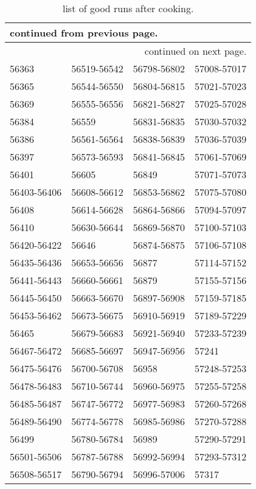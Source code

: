 \begin{center}
\begin{singlespacing}
\begin{longtable}{llll}
\caption[ Production Run List]{\label{tab:data.cook.goodruns}list of good runs after cooking.} \\

\hline \hline
\endfirsthead

\multicolumn{4}{l}{\scriptsize continued from previous page.} \\
\hline
\endhead

\hline
\multicolumn{4}{r}{\scriptsize continued on next page.} \\
\endfoot

\hline \hline
\endlastfoot

56363 & 56519-56542 & 56798-56802 & 57008-57017 \\
56365 & 56544-56550 & 56804-56815 & 57021-57023 \\
56369 & 56555-56556 & 56821-56827 & 57025-57028 \\
56384 & 56559 & 56831-56835 & 57030-57032 \\
56386 & 56561-56564 & 56838-56839 & 57036-57039 \\
56397 & 56573-56593 & 56841-56845 & 57061-57069 \\
56401 & 56605 & 56849 & 57071-57073 \\
56403-56406 & 56608-56612 & 56853-56862 & 57075-57080 \\
56408 & 56614-56628 & 56864-56866 & 57094-57097 \\
56410 & 56630-56644 & 56869-56870 & 57100-57103 \\
56420-56422 & 56646 & 56874-56875 & 57106-57108 \\
56435-56436 & 56653-56656 & 56877 & 57114-57152 \\
56441-56443 & 56660-56661 & 56879 & 57155-57156 \\
56445-56450 & 56663-56670 & 56897-56908 & 57159-57185 \\
56453-56462 & 56673-56675 & 56910-56919 & 57189-57229 \\
56465 & 56679-56683 & 56921-56940 & 57233-57239 \\
56467-56472 & 56685-56697 & 56947-56956 & 57241 \\
56475-56476 & 56700-56708 & 56958 & 57248-57253 \\
56478-56483 & 56710-56744 & 56960-56975 & 57255-57258 \\
56485-56487 & 56747-56772 & 56977-56983 & 57260-57268 \\
56489-56490 & 56774-56778 & 56985-56986 & 57270-57288 \\
56499 & 56780-56784 & 56989 & 57290-57291 \\
56501-56506 & 56787-56788 & 56992-56994 & 57293-57312 \\
56508-56517 & 56790-56794 & 56996-57006 & 57317 \\

\end{longtable}
\end{singlespacing}
\end{center}
\vspace{20pt}